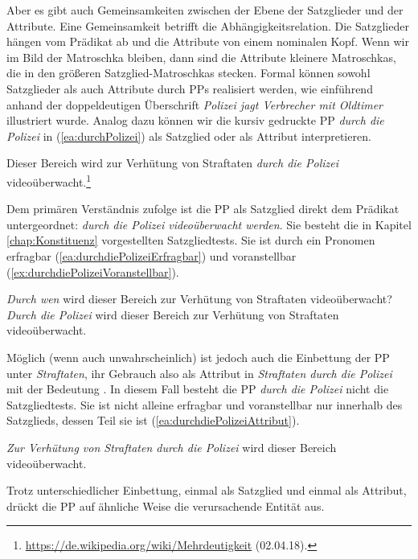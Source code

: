 Aber es gibt auch Gemeinsamkeiten zwischen der Ebene der Satzglieder und der Attribute. Eine Gemeinsamkeit betrifft die Abhängigkeitsrelation. Die Satzglieder hängen vom Prädikat ab und die Attribute von einem nominalen Kopf. Wenn wir im Bild der Matroschka bleiben, dann sind die Attribute kleinere Matroschkas, die in den größeren Satzglied-Matroschkas stecken. Formal können sowohl Satzglieder als auch Attribute durch PPs realisiert werden, wie einführend anhand der doppeldeutigen Überschrift \textit{Polizei jagt Verbrecher mit Oldtimer} illustriert wurde. Analog dazu können wir die kursiv gedruckte PP \textit{durch die Polizei} in (\ref{ea:durchPolizei}) als Satzglied oder als Attribut interpretieren.

\ea \label{ea:durchPolizei} Dieser Bereich wird zur Verhütung von Straftaten \textit{durch die Polizei} videoüberwacht.\footnote{\url{https://de.wikipedia.org/wiki/Mehrdeutigkeit} (02.04.18).} 
\z

Dem primären Verständnis zufolge ist die PP als Satzglied direkt dem Prädikat untergeordnet: \textit{durch die Polizei videoüberwacht werden}. Sie besteht die in Kapitel \ref{chap:Konstituenz} vorgestellten Satzgliedtests. Sie ist durch ein Pronomen erfragbar (\ref{ea:durchdiePolizeiErfragbar}) und voranstellbar (\ref{ex:durchdiePolizeiVoranstellbar}). 

\ea \label{ea:SGTestdurchdiePolizei}
\ea \label{ea:durchdiePolizeiErfragbar} \textit{Durch wen} wird dieser Bereich zur Verhütung von Straftaten videoüberwacht?
\ex \label{ex:durchdiePolizeiVoranstellbar} \textit{Durch die Polizei} wird dieser Bereich zur Verhütung von Straftaten videoüberwacht. 
\z 
\z 

Möglich (wenn auch unwahrscheinlich) ist jedoch auch die Einbettung der PP unter \textit{Straftaten}, ihr Gebrauch also als Attribut in \textit{Straftaten durch die Polizei} mit der Bedeutung . In diesem Fall besteht die PP \textit{durch die Polizei} nicht die Satzgliedtests. Sie ist nicht alleine erfragbar und voranstellbar nur innerhalb des Satzglieds, dessen Teil sie ist  (\ref{ea:durchdiePolizeiAttribut}).

\ea \label{ea:durchdiePolizeiAttribut} \textit{Zur Verhütung von Straftaten durch die Polizei} wird dieser Bereich videoüberwacht.
\z 

Trotz unterschiedlicher Einbettung, einmal als Satzglied und einmal als Attribut, drückt die PP auf ähnliche Weise die verursachende Entität aus. 

